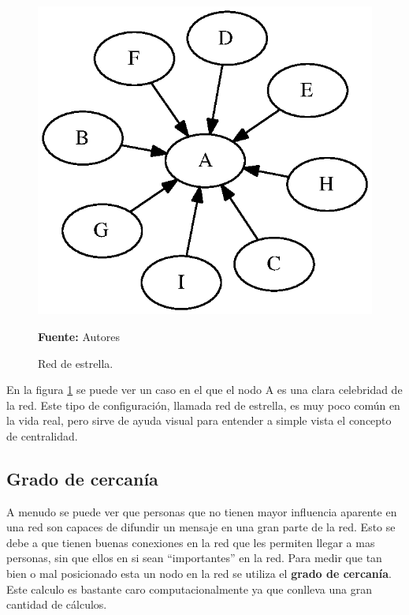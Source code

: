 \begin{figure}[!htb]
  \begin{center}
    \includegraphics{./imagenes/red_estrella.eps}
    \caption{Red de estrella.}
    \label{fig:red_estrella}
    \textbf{Fuente:}  Autores
  \end{center}
\end{figure}


En la figura \ref{fig:red_estrella} se puede ver un caso en el que el nodo A es una clara celebridad de la red. Este tipo de configuración, llamada red de estrella, es muy poco común en la vida real, pero sirve de ayuda visual para entender a simple vista el concepto de centralidad.

\subsection{Grado de cercanía}

A menudo se puede ver que personas que no tienen mayor influencia aparente en una red son capaces de difundir un mensaje en una gran parte de la red. Esto se debe a que tienen buenas conexiones en la red que les permiten llegar a mas personas, sin que ellos en si sean ``importantes'' en la red. Para medir que tan bien o mal posicionado esta un nodo en la red se utiliza el \textbf{grado de cercanía}. Este calculo es bastante caro computacionalmente ya que conlleva una gran cantidad de cálculos.

